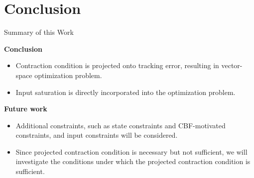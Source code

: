 \section{Conclusion}

\begin{frame}{Summary of this Work}{}

    \textbf{Conclusion}

    \begin{itemize}
        \item Contraction condition is projected onto tracking error, resulting in vector-space optimization problem.
        \item Input saturation is directly incorporated into the optimization problem.
    \end{itemize}

    \textbf{Future work}

    \begin{itemize}
        \item Additional constraints, such as state constraints and CBF-motivated constraints, and input constraints will be considered.
        \item Since projected contraction condition is necessary but not sufficient, we will investigate the conditions under which the projected contraction condition is sufficient.
    \end{itemize}
    
\end{frame}

